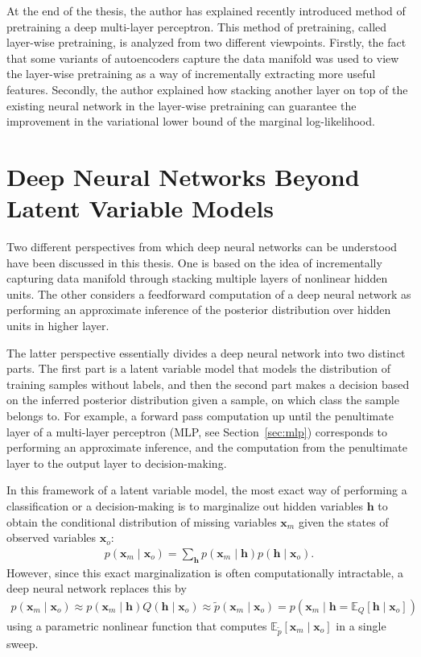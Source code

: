 \documentclass[dissertation,nocontribution,draft*]{aaltoseries}
\newcommand{\vect}[1]{\mathbf{#1}}
\newcommand{\vh}[0]{\vect{h}}
\newcommand{\vx}[0]{\vect{x}}
\newcommand{\E}[0]{\mathbb{E}}
\begin{document}
At the end of the thesis, the author has explained recently
introduced method of pretraining a deep multi-layer
perceptron. This method of pretraining, called layer-wise
pretraining, is analyzed from two different viewpoints.
Firstly, the fact that some variants of autoencoders capture
the data manifold was used to view the layer-wise
pretraining as a way of incrementally extracting more useful
features. Secondly, the author explained how stacking
another layer on top of the existing neural network in the
layer-wise pretraining can guarantee the improvement in the
variational lower bound of the marginal log-likelihood.


\section{Deep Neural Networks Beyond Latent Variable Models}

Two different perspectives from which deep neural networks
can be understood have been discussed in this thesis. One is
based on the idea of incrementally capturing data manifold
through stacking multiple layers of nonlinear hidden units.
The other considers a feedforward computation of a deep
neural network as performing an approximate inference of the
posterior distribution over hidden units in higher layer.

The latter perspective essentially divides a deep neural
network into two distinct parts. The first part is a latent
variable model that models the distribution of training
samples without labels, and then the second part makes a
decision based on the inferred posterior distribution given
a sample, on which class the sample belongs to. For example,
a forward pass computation up until the penultimate layer of
a multi-layer perceptron (MLP, see Section~\ref{sec:mlp})
corresponds to performing an approximate inference, and the
computation from the penultimate layer to the output layer
to decision-making.

In this framework of a latent variable model, the most exact
way of performing a classification or a decision-making is
to marginalize out hidden variables $\vh$ to obtain the
conditional distribution of missing variables $\vx_m$ given
the states of observed variables $\vx_o$:
\begin{align*}
    p(\vx_m \mid \vx_o) = \sum_{\vh} p(\vx_m \mid \vh) p(\vh
    \mid \vx_o).
\end{align*}
However, since this exact marginalization is often
computationally intractable, a deep neural network replaces
this by 
\begin{align*}
    p(\vx_m \mid \vx_o) \approx  p(\vx_m \mid \vh) Q(\vh
    \mid \vx_o) \approx \tilde{p}(\vx_m \mid \vx_o)
    = p\left(\vx_m \mid \vh =
    \E_Q\left[\vh \mid \vx_o \right]\right)
\end{align*}
using a parametric nonlinear function that computes
$\E_{\tilde{p}}\left[ \vx_m \mid \vx_o \right]$ in a single sweep.
\end{document}
